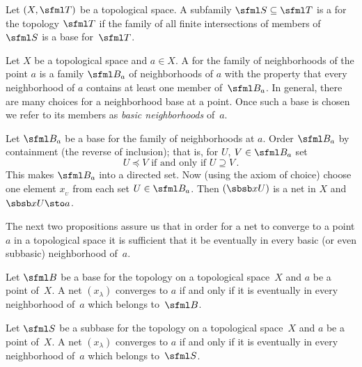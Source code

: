 \begin{defn} Let $(X,\sfml T)$ be a topological space.  A subfamily $\sfml S \subseteq
\sfml T$ is a
 for the topology $\sfml T$ if the family of all finite intersections of
members of $\sfml S$ is a base for~$\sfml T$.
\end{defn}

\begin{exam}\label{C031429} Let $X$ be a topological space and $a \in X$. A
 for the family of neighborhoods of the point $a$ is a family $\sfml B_a$ of
neighborhoods of $a$ with the property that every neighborhood of $a$ contains at least
one member of~$\sfml B_a$.  In general, there are many choices for a neighborhood base at
a point. Once such a base is chosen we refer to its members as
\emph{basic neighborhoods} of~$a$.

Let $\sfml B_a$ be a base for the family of neighborhoods at $a$.  Order $\sfml B_a$ by
containment (the reverse of inclusion); that is, for $U$, $V \in \sfml B_a$ set
  \[ U \preceq V \text{ if and only if } U \supseteq V\,. \]
This makes $\sfml B_a$ into a directed set. Now (using the axiom of choice) choose one
element $x_{{}_U}$ from each set $U \in \sfml B_a$.  Then $(\sbsb xU)$ is a net in $X$
and $\sbsb xU \sto a$.
\end{exam}

The next two propositions assure us that in order for a net to converge to a point $a$ in
a topological space it is sufficient that it be eventually in every basic (or even
subbasic) neighborhood of~$a$.

\begin{prop}\label{C031431} Let $\sfml B$ be a base for the topology on a topological
space~$X$ and $a$ be a point of~$X$. A net $(x_\lambda)$  converges to  $a$ if and only
if it is eventually in every neighborhood of~$a$ which belongs to~$\sfml B$.
\end{prop}

\begin{prop}\label{C031434} Let $\sfml S$ be a subbase for the topology on a topological
space~$X$ and $a$ be a point of~$X$.  A net $(x_\lambda)$ converges to $a$ if and only if
it is eventually in every neighborhood of~$a$ which belongs to~$\sfml S$.
\end{prop}

